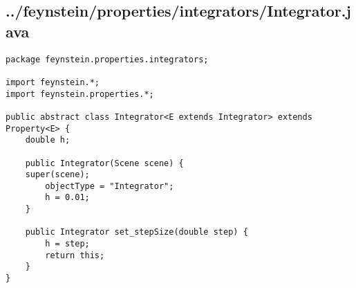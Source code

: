 \subsection*{../feynstein/properties/integrators/Integrator.java}
\begin{lstlisting}
package feynstein.properties.integrators;

import feynstein.*;
import feynstein.properties.*;

public abstract class Integrator<E extends Integrator> extends Property<E> {
    double h;
	
    public Integrator(Scene scene) {
	super(scene);
		objectType = "Integrator";
		h = 0.01;
    }

    public Integrator set_stepSize(double step) {
		h = step;
		return this;
    }
}\end{lstlisting}

